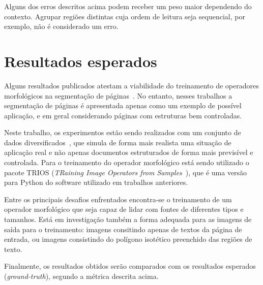 \documentclass[10pt,a4paper,conference]{IEEEtran}
\begin{document}
Alguns dos erros descritos acima podem receber um peso maior
dependendo do contexto. Agrupar regiões distintas cuja ordem de
leitura seja sequencial, por exemplo, não é considerado um erro.

\section{Resultados esperados}

Alguns resultados publicados atestam a viabilidade do
treinamento de operadores morfológicos na segmentação de
páginas~\cite{HirBarTer:00,Nina:2010a}. No entanto, nesses trabalhos a
segmentação de páginas é apresentada apenas como um exemplo de
possível aplicação, e em geral considerando páginas com estruturas bem
controladas.

Neste trabalho, os experimentos estão sendo realizados com um conjunto
de dados
diversificados~\cite{Antonacopoulos09arealistic}, que simula de forma
mais realista uma situação de aplicação real e não apenas documentos
estruturados de forma mais previsível e controlada. Para o treinamento
do operador morfológico está sendo utilizado o pacote TRIOS
(\emph{TRaining Image Operators from Samples}~\cite{trios:online}),
que é uma versão para Python do software utilizado em trabalhos
anteriores.

Entre os principais desafios enfrentados encontra-se o treinamento de
um operador morfológico que seja capaz de lidar com fontes de
diferentes tipos e tamanhos. Está em investigação também a forma
adequada para as imagens de saída para o treinamento: imagens
consitindo apenas de textos da página de entrada, ou imagens
consistindo do polígono isotético preenchido das regiões de texto.

Finalmente, os resultados obtidos serão comparados com os resultados
esperados (\emph{ground-truth}), segundo a métrica descrita acima.


{\small 
}

%
%
\end{document}
